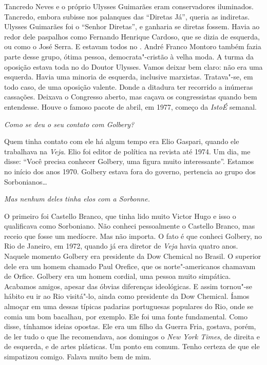 \normalfont 
Tancredo Neves e o próprio Ulysses Guimarães eram
conservadores iluminados. Tancredo, embora subisse nos palanques das
``Diretas Já'', queria as indiretas. Ulysses Guimarães foi o ``Senhor
Diretas'', e ganharia se diretas fossem. Havia ao redor dele paspalhos
como Fernando Henrique Cardoso, que se dizia de esquerda, ou como o José
Serra. E estavam todos no . André Franco Montoro também fazia parte
desse grupo, ótima pessoa, democrata"-cristão à velha moda. A turma da
oposição estava toda no  do Doutor Ulysses. Vamos deixar bem claro:
não era uma esquerda. Havia uma minoria de esquerda, inclusive
marxistas. Tratava"-se, em todo caso, de uma oposição valente. Donde a
ditadura ter recorrido a inúmeras cassações. Deixava o Congresso aberto,
mas caçava os congressistas quando bem entendesse. Houve o famoso pacote
de abril, em 1977, começo da \emph{IstoÉ} semanal.

\itshape
 Como se deu o seu contato com Golbery?

\normalfont 
Quem tinha contato com ele há algum tempo era Elio
Gaspari, quando ele trabalhava na \emph{Veja}. Elio foi editor de
política na revista até 1974. Um dia, me disse: ``Você precisa conhecer
Golbery, uma figura muito interessante''. Estamos no início dos anos
1970. Golbery estava fora do governo, pertencia ao grupo dos
Sorbonianos…

\itshape
 Mas nenhum deles tinha elos com a Sorbonne.

\normalfont 
O primeiro foi Castello Branco, que tinha lido muito
Victor Hugo e isso o qualificava como Sorboniano. Não conheci
pessoalmente o Castello Branco, mas receio que fosse um medíocre. Mas
não importa. O fato é que conheci Golbery, no Rio de Janeiro, em 1972,
quando já era diretor de \emph{Veja} havia quatro anos. Naquele momento
Golbery era presidente da Dow Chemical no Brasil. O superior dele era um
homem chamado Paul Orefice, que os norte"-americanos chamavam de Orfice.
Golbery era um homem cordial, uma pessoa muito simpática. Acabamos
amigos, apesar das óbvias diferenças ideológicas. E assim tornou"-se
hábito eu ir ao Rio visitá"-lo, ainda como presidente da Dow Chemical.
Íamos almoçar em uma dessas típicas padarias portuguesas populares do
Rio, onde se comia um bom bacalhau, por exemplo. Ele foi uma fonte
fundamental. Como disse, tínhamos ideias opostas. Ele era um filho da
Guerra Fria, gostava, porém, de ler tudo o que lhe recomendava, aos
domingos o \emph{New York Times}, de direita e de esquerda, e de artes
plásticas. Um ponto em comum. Tenho certeza de que ele simpatizou
comigo. Falava muito bem de mim.

